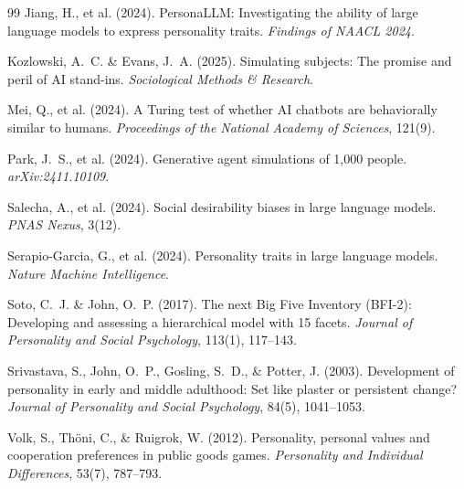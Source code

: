 \documentclass[12pt, a4paper]{article}
\begin{document}
\begin{thebibliography}{99}
Jiang, H., et al. (2024).
\newblock PersonaLLM: Investigating the ability of large language models to express personality traits.
\newblock \emph{Findings of NAACL 2024}.

Kozlowski, A.~C. \& Evans, J.~A. (2025).
\newblock Simulating subjects: The promise and peril of AI stand-ins.
\newblock \emph{Sociological Methods \& Research}.

Mei, Q., et al. (2024).
\newblock A Turing test of whether AI chatbots are behaviorally similar to humans.
\newblock \emph{Proceedings of the National Academy of Sciences}, 121(9).

Park, J.~S., et al. (2024).
\newblock Generative agent simulations of 1,000 people.
\newblock \emph{arXiv:2411.10109}.

Salecha, A., et al. (2024).
\newblock Social desirability biases in large language models.
\newblock \emph{PNAS Nexus}, 3(12).

Serapio-Garcia, G., et al. (2024).
\newblock Personality traits in large language models.
\newblock \emph{Nature Machine Intelligence}.

Soto, C.~J. \& John, O.~P. (2017).
\newblock The next Big Five Inventory (BFI-2): Developing and assessing a hierarchical model with 15 facets.
\newblock \emph{Journal of Personality and Social Psychology}, 113(1), 117--143.

Srivastava, S., John, O.~P., Gosling, S.~D., \& Potter, J. (2003).
\newblock Development of personality in early and middle adulthood: Set like plaster or persistent change?
\newblock \emph{Journal of Personality and Social Psychology}, 84(5), 1041--1053.

Volk, S., Th{\"o}ni, C., \& Ruigrok, W. (2012).
\newblock Personality, personal values and cooperation preferences in public goods games.
\newblock \emph{Personality and Individual Differences}, 53(7), 787--793.

\end{thebibliography}
\end{document}
